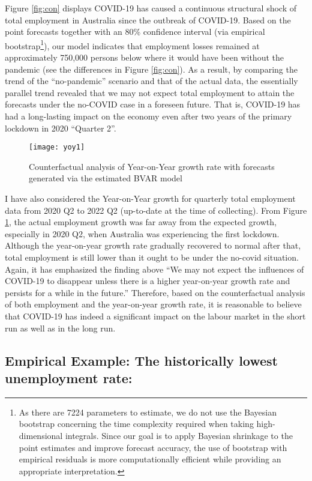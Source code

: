 \documentclass{monashthesis}
\begin{document}
Figure \ref{fig:con} displays COVID-19 has caused a continuous structural shock of total employment in Australia since the outbreak of COVID-19. Based on the point forecasts together with an 80\% confidence interval (via empirical bootstrap\footnote{As there are 7224 parameters to estimate, we do not use the Bayesian bootstrap concerning the time complexity required when taking high-dimensional integrals. Since our goal is to apply Bayesian shrinkage to the point estimates and improve forecast accuracy, the use of bootstrap with empirical residuals is more computationally efficient while providing an appropriate interpretation.}), our model indicates that employment losses remained at approximately 750,000 persons below where it would have been without the pandemic (see the differences in Figure \ref{fig:con}). As a result, by comparing the trend of the ``no-pandemic'' scenario and that of the actual data, the essentially parallel trend revealed that we may not expect total employment to attain the forecasts under the no-COVID case in a foreseen future. That is, COVID-19 has had a long-lasting impact on the economy even after two years of the primary lockdown in 2020 ``Quarter 2''.

\begin{figure}[H]
\texttt{[image: yoy1]}
\centering
\caption{Counterfactual analysis of Year-on-Year growth rate with forecasts generated via the estimated BVAR model}
\label{fig:yoy}
\end{figure}

I have also considered the Year-on-Year growth for quarterly total employment data from 2020 Q2 to 2022 Q2 (up-to-date at the time of collecting). From Figure \ref{fig:yoy}, the actual employment growth was far away from the expected growth, especially in 2020 Q2, when Australia was experiencing the first lockdown. Although the year-on-year growth rate gradually recovered to normal after that, total employment is still lower than it ought to be under the no-covid situation. Again, it has emphasized the finding above ``We may not expect the influences of COVID-19 to disappear unless there is a higher year-on-year growth rate and persists for a while in the future.'' Therefore, based on the counterfactual analysis of both employment and the year-on-year growth rate, it is reasonable to believe that COVID-19 has indeed a significant impact on the labour market in the short run as well as in the long run.

\hypertarget{empirical-example-the-historically-lowest-unemployment-rate}{%
\subsection{Empirical Example: The historically lowest unemployment rate:}\label{empirical-example-the-historically-lowest-unemployment-rate}}
\end{document}
